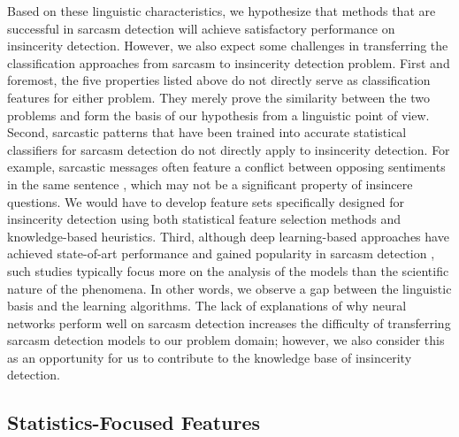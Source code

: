 \documentclass[12pt]{diazessay} %
\begin{document}
Based on these linguistic characteristics, we hypothesize that methods that are successful in sarcasm detection will achieve satisfactory performance on insincerity detection. However, we also expect some challenges in transferring the classification approaches from sarcasm to insincerity detection problem. First and foremost, the five properties listed above do not directly serve as classification features for either problem. They merely prove the similarity between the two problems and form the basis of our hypothesis from a linguistic point of view. Second, sarcastic patterns that have been trained into accurate statistical classifiers for sarcasm detection do not directly apply to insincerity detection. For example, sarcastic messages often feature a conflict between opposing sentiments in the same sentence \citep{joshi2017}, which may not be a significant property of insincere questions. We would have to develop feature sets specifically designed for insincerity detection using both statistical feature selection methods and knowledge-based heuristics. Third, although deep learning-based approaches have achieved state-of-art performance and gained popularity in sarcasm detection \citep{joshi2017}, such studies typically focus more on the analysis of the models than the scientific nature of the phenomena. In other words, we observe a gap between the linguistic basis and the learning algorithms. The lack of explanations of why neural networks perform well on sarcasm detection increases the difficulty of transferring sarcasm detection models to our problem domain; however, we also consider this as an opportunity for us to contribute to the knowledge base of insincerity detection. 

\subsection{Statistics-Focused Features} \label{statistic-features}
\end{document}
